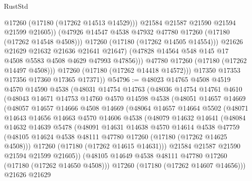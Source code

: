 \begin{lexlean}{RustStd}
\begin{coremodule}
                          @17260
                          (@17180 (@17262 @14513 @14529)))
                        @21584
                        @21587
                        @21590
                        @21594
                        @21599
                        @21605))
                    (@47926 @14547 @4538 @47932 @47780 @17260 (@17180 (@17262 @14548 @4508)))
                    @17260
                    (@17180 (@17262 @14505 @14554)))
                  @21626
                  @21629
                  @21632
                  @21636
                  @21641
                  @21647)
                (@47828 @14564 @548 @145 @17 @4508 @5583 @4508 @4629 @47993 @47856)))
            @47780
            @17260
            (@17180 (@17262 @14497 @4508)))
          @17260
          (@17180 (@17262 @14418 @14572)))
        @17350
        @17353
        @17356
        @17360
        @17365
        @17371))
@54796 := @48023
    @14765
    @4508
    @4519
    @4570
    @14590
    @4538
    (@48031
      @14754
      @14763
      (@48036
        @14754
        @14761
        @4610
        (@48043
          @14671
          @14753
          @14760
          @4570
          @14598
          @4538
          (@48051
            @14657
            @14669
            (@48057
              @14657
              @14666
              @4508
              @14669
              (@48064
                @14657
                @14664
                @5502
                (@48071
                  @14643
                  @14656
                  @14663
                  @4570
                  @14606
                  @4538
                  (@48079
                    @14632
                    @14641
                    (@48084
                      @14632
                      @14639
                      @5478
                      (@48091
                        @14631
                        @14638
                        @4570
                        @14614
                        @4538
                        @47759
                        (@48105 @14624 @4538 @48111 @47780 @17260 (@17180 (@17262 @14625 @4508)))
                        @17260
                        (@17180 (@17262 @14615 @14631)))
                      @21584
                      @21587
                      @21590
                      @21594
                      @21599
                      @21605))
                  (@48105 @14649 @4538 @48111 @47780 @17260 (@17180 (@17262 @14650 @4508)))
                  @17260
                  (@17180 (@17262 @14607 @14656)))
                @21626
                @21629

\end{coremodule}
\end{lexlean}
